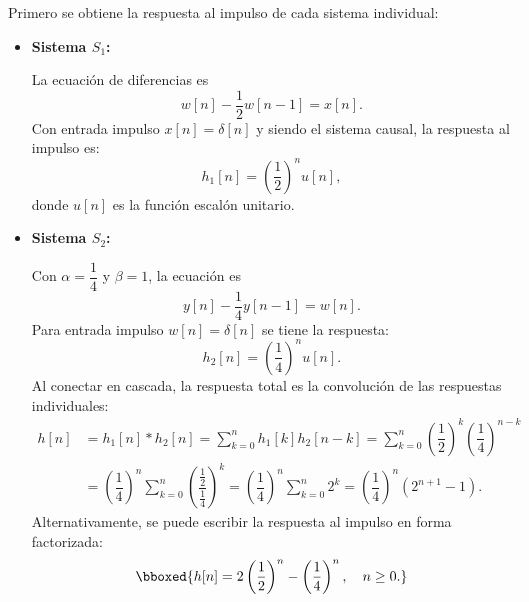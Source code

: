 \begin{enumerate}[label=\color{red}\textbf{\arabic*)}]
\begin{enumerate}[label=\color{red}\textbf{\alph*)}]
        Primero se obtiene la respuesta al impulso de cada sistema individual:
        \begin{itemize}[label=\textbullet]
            \item \textbf{Sistema $S_1$:}

                La ecuación de diferencias es \[
                    w[n]-\dfrac{1}{2}w[n-1]=x[n].
                \] 
                Con entrada impulso $x[n]=\delta[n]$ y siendo el sistema causal, la respuesta al impulso es:  \[
                    h_1[n]=\left( \dfrac{1}{2} \right) ^n u[n],
                \] donde $u[n]$ es la función escalón unitario.
            \item \textbf{Sistema $S_2$:}

                Con $\alpha=\dfrac{1}{4}$ y $\beta=1$, la ecuación es  \[
                    y[n]-\dfrac{1}{4}y[n-1]=w[n].
                \] 
                Para entrada impulso $w[n]=\delta[n]$ se tiene la respuesta:  \[
                    h_2[n]=\left( \dfrac{1}{4} \right) ^nu[n].
                \] 
                Al conectar en cascada, la respuesta total es la convolución de las respuestas individuales: \[
\begin{aligned}
                    h[n]&=h_1[n]\ast h_2[n]=\sum_{k=0}^{n} h_1[k]h_2[n-k]=\sum_{k=0}^{n} \left( \dfrac{1}{2} \right) ^k\left( \dfrac{1}{4} \right) ^{n-k}\\
&=\left( \dfrac{1}{4} \right) ^n \sum_{k=0}^{n} \left( \dfrac{\frac{1}{2} }{\frac{1}{4} } \right) ^k=\left( \dfrac{1}{4} \right) ^n \sum_{k=0}^{n} 2^k =\left( \dfrac{1}{4} \right) ^n\left( 2^{n+1}-1 \right).
\end{aligned}
                \]
                Alternativamente, se puede escribir la respuesta al impulso en forma factorizada: \[
                \bboxed{h[n]=2\left( \dfrac{1}{2} \right) ^n-\left( \dfrac{1}{4} \right) ^n,\quad n\ge 0.}
                \] 
                \begin{center}
\end{center}
\end{itemize}
\end{enumerate}
\end{enumerate}
